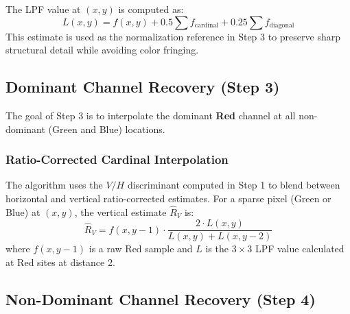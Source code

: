 \documentclass[a4paper,11pt]{article}
\newcommand{\tile}[6][]{%
  \if#4r\def\tilecol{cfared}\else
    \if#4g\def\tilecol{cfagreen}\else
      \if#4b\def\tilecol{cfablue}\else
        \def\tilecol{cfagrey}\fi\fi\fi
  \node[cfa-tile, fill=\tilecol!60, #1] (T#2#3) at (#2*0.8, -#3*0.8) {};
  \ifx&#5&\else\node[cfa-coords, above=0pt of T#2#3] {#5};\fi
  \ifx&#6&\else\node[cfa-weight] at (T#2#3) {#6};\fi
}
\begin{document}
The LPF value at $(x,y)$ is computed as:
\[
    L(x,y) = f(x,y) + 0.5 \sum f_{\text{cardinal}} + 0.25 \sum f_{\text{diagonal}}
\]
This estimate is used as the normalization reference in Step 3 to preserve sharp structural detail while avoiding color fringing.

\subsection{Dominant Channel Recovery (Step 3)}

The goal of Step 3 is to interpolate the dominant \textbf{Red} channel at all non-dominant (Green and Blue) locations. 

\subsubsection{Ratio-Corrected Cardinal Interpolation}
The algorithm uses the $V/H$ discriminant computed in Step 1 to blend between horizontal and vertical ratio-corrected estimates. For a sparse pixel (Green or Blue) at $(x,y)$, the vertical estimate $\hat{R}_V$ is:
\[
    \hat{R}_V = f(x,y-1) \cdot \frac{2 \cdot L(x,y)}{L(x,y) + L(x,y-2)}
\]
where $f(x,y-1)$ is a raw Red sample and $L$ is the $3\times3$ LPF value calculated at Red sites at distance 2.

\begin{center}
\end{center}

\subsection{Non-Dominant Channel Recovery (Step 4)}
\end{document}
